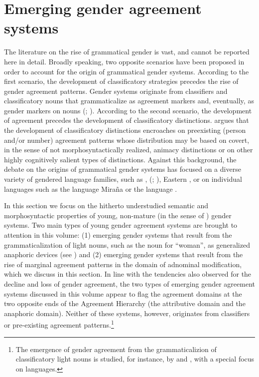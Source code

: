 \documentclass[output=collectionpaper]{langsci/langscibook}
\begin{document}
\section{Emerging gender agreement systems}
\label{subsec:emerging}
The literature on the rise of grammatical gender is vast, and cannot be reported here in detail. Broadly speaking, two opposite scenarios have been proposed in order to account for the origin of grammatical gender systems. According to the first scenario, the development of classificatory strategies precedes the rise of gender agreement patterns. Gender systems originate from classifiers and classificatory nouns that grammaticalize as agreement markers and, eventually, as gender markers on nouns (\citealt{Greenberg1978}; \citealt{Corbett1991}).
According to the second scenario, the development of agreement precedes the development of classificatory distinctions.  \citet[139--142]{Nichols1992} argues that the development of classificatory distinctions encroaches on preexisting (person and/or number) agreement patterns whose distribution may be based on covert, in the sense of not morphosyntactically realized, animacy distinctions or on other highly cognitively salient types of distinctions.
Against this background, the debate on the origins of grammatical gender systems has focused on a diverse variety of gendered language families, such as  \citep{Matasovic2004,Luraghi2011},  (\citealt{Greenberg1978}; \citealt{Williamson1994}), Eastern  \citep{Heine1983}, or on individual languages such as the  language Mira\~{n}a \citep{Seifart2005} or the  language  \citep{Reid1997}.

In this section we focus on the hitherto understudied semantic and morphosyntactic properties of young, non-mature (in the sense of \citealt{Dahl2004}) gender systems. Two main types of young gender agreement systems are brought to attention in this volume: (1) emerging gender systems that result from the grammaticalization of light nouns, such as the noun for ``woman'', as generalized anaphoric devices (see \citealt{Waelchlithisyear}) and (2) emerging gender systems that result from the rise of marginal agreement patterns in the domain of adnominal modification, which we discuss in this section. In line with the tendencies also observed for the decline and loss of gender agreement, the two types of emerging gender agreement systems discussed in this volume appear to flag the agreement domains at the two opposite ends of the Agreement Hierarchy (the attributive domain and the anaphoric domain). Neither of these systems, however, originates from classifiers or pre-existing agreement patterns.\footnote{The emergence of gender agreement from the grammaticalizion of classificatory light nouns is studied, for instance, by \citet{Grinevald2004} and \cite{Seifart2005}, with a special focus on  languages.}
\end{document}
